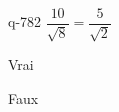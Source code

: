 \begin{truefalse}{q-782}
$\dfrac{10}{\sqrt{8}}=\dfrac{5}{\sqrt{2}}$
\item* Vrai
\item Faux
\end{truefalse}

